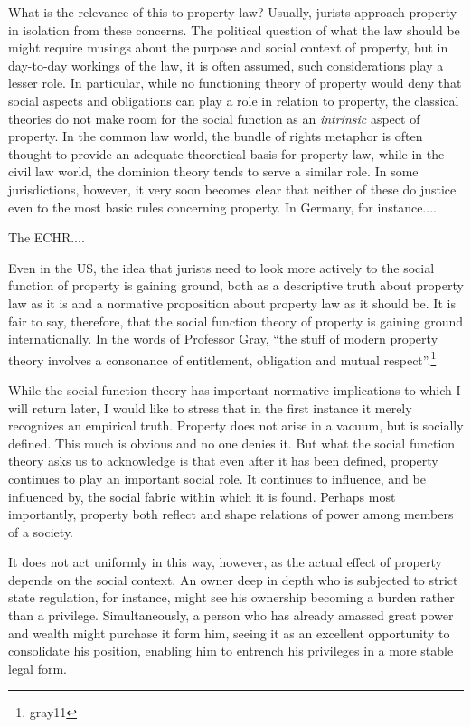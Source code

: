 What is the relevance of this to property law? Usually, jurists approach property in isolation from these concerns. The political question of what the law should be might require musings about the purpose and social context of property, but in day-to-day workings of the law, it is often assumed, such considerations play a lesser role. In particular, while no functioning theory of property would deny that social aspects and obligations can play a role in relation to property, the classical theories do not make room for the social function as an {\it intrinsic} aspect of property. In the common law world, the bundle of rights metaphor is often thought to provide an adequate theoretical basis for property law, while in the civil law world, the dominion theory tends to serve a similar role. In some jurisdictions, however, it very soon becomes clear that neither of these do justice even to the most basic rules concerning property. In Germany, for instance....

The ECHR....

Even in the US, the idea that jurists need to look more actively to the social function of property is gaining ground, both as a descriptive truth about property law as it is and a normative proposition about property law as it should be. It is fair to say, therefore, that the social function theory of property is gaining ground internationally. In the words of Professor Gray, ``the stuff of modern property theory involves a consonance of entitlement, obligation and mutual respect''.\footnote[37]{gray11}

While the social function theory has important normative implications to which I will return later, I would like to stress that in the first instance it merely recognizes an empirical truth. Property does not arise in a vacuum, but is socially defined. This much is obvious and no one denies it. But what the social function theory asks us to acknowledge is that even after it has been defined, property continues to play an important social role. It continues to influence, and be influenced by, the social fabric within which it is found. Perhaps most importantly, property both reflect and shape relations of power among members of a society. 

It does not act uniformly in this way, however, as the actual effect of property depends on the social context. An owner deep in depth who is subjected to strict state regulation, for instance, might see his ownership becoming a burden rather than a privilege. Simultaneously, a person who has already amassed great power and wealth might purchase it form him, seeing it as an excellent opportunity to consolidate his position, enabling him to entrench his privileges in a more stable legal form. 

